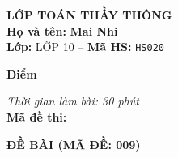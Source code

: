 \noindent
\begin{tcolorbox}[colback=white,colframe=black,arc=0mm,boxrule=0.8pt,top=4pt,bottom=4pt,left=6pt,right=6pt]
	\begin{minipage}[c]{0.44\textwidth}
		{\bfseries\large LỚP TOÁN THẦY THÔNG}\\[3pt]
		\textbf{Họ và tên:} \textbf{\large Mai Nhi}\\[3pt]
		\textbf{Lớp:} LỚP 10 \quad -- \quad \textbf{Mã HS:} \texttt{HS020}
	\end{minipage}
	\hfill
	\begin{minipage}[c]{0.22\textwidth}
		\begin{tcolorbox}[colback=white,colframe=black,arc=0mm,boxrule=0.6pt,height=1.8cm,halign=center,valign=top,top=2pt]
			{\bfseries\normalsize Điểm}
		\end{tcolorbox}
	\end{minipage}
	\hfill
	\begin{minipage}[c]{0.30\textwidth}
		\raggedleft
		\textit{Thời gian làm bài: 30 phút}\\[4pt]
		\textbf{Mã đề thi:} 
	\end{minipage}
\end{tcolorbox}
\vspace{0.25cm}

\noindent\textbf{\large ĐỀ BÀI (MÃ ĐỀ: 009)}
\vspace{0.1cm}

